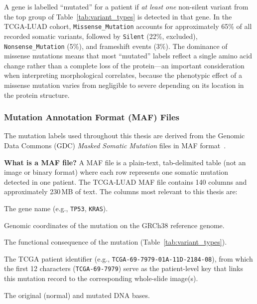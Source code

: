 A gene is labelled ``mutated'' for a patient if \emph{at least one}
non-silent variant from the top group of Table~\ref{tab:variant_types}
is detected in that gene.
In the TCGA-LUAD cohort, \texttt{Missense\_Mutation} accounts for
approximately 65\% of all recorded somatic variants, followed by
\texttt{Silent} (22\%, excluded), \texttt{Nonsense\_Mutation} (5\%),
and frameshift events (3\%).
The dominance of missense mutations means that most ``mutated'' labels
reflect a single amino acid change rather than a complete loss of the
protein---an important consideration when interpreting morphological
correlates, because the phenotypic effect of a missense mutation
varies from negligible to severe depending on its location in the
protein structure.


\subsubsection{Mutation Annotation Format (MAF) Files}
\label{sec:uc:tcga:maf}

The mutation labels used throughout this thesis are derived from the
Genomic Data Commons (GDC) \emph{Masked Somatic Mutation} files in
MAF format~\cite{gdc2024maf}.

\textbf{What is a MAF file?}
A MAF file is a plain-text, tab-delimited table (not an image or
binary format) where each row represents one somatic mutation detected
in one patient.
The TCGA-LUAD MAF file contains 140 columns and approximately 230\,MB
of text.
The columns most relevant to this thesis are:
\begin{description}[leftmargin=2.5cm, style=nextline]
    \item[\texttt{Hugo\_Symbol}] The gene name (e.g., \texttt{TP53},
    \texttt{KRAS}).
    \item[\texttt{Chromosome}, \texttt{Start/End\_Position}]
    Genomic coordinates of the mutation on the GRCh38 reference genome.
    \item[\texttt{Variant\_Classification}] The functional consequence
    of the mutation (Table~\ref{tab:variant_types}).
    \item[\texttt{Tumor\_Sample\_Barcode}] The TCGA patient identifier
    (e.g., \texttt{TCGA-69-7979-01A-11D-2184-08}), from which the
    first 12 characters (\texttt{TCGA-69-7979}) serve as the
    patient-level key that links this mutation record to the
    corresponding whole-slide image(s).
    \item[\texttt{Reference/Tumor\_Seq\_Allele}] The original (normal)
    and mutated DNA bases.
\end{description}

